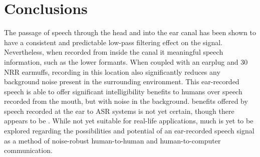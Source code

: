 \section{Conclusions}\label{chap5:conclusions}

The passage of speech through the head and into the ear canal has been shown to have a consistent and predictable low-pass filtering effect on the signal.  Nevertheless, when recorded from inside the canal it \DIFdelbegin {}\DIFdelend \DIFaddbegin {}\DIFaddend meaningful speech information, such as the lower formants.  When coupled with an earplug and 30 NRR earmuffs, recording in this location also significantly reduces any background noise present in the surrounding environment.  This ear-recorded speech is able to offer significant intelligibility benefits to humans over speech recorded from the mouth, but with noise in the background.  \DIFdelbegin {}\DIFdelend \DIFaddbegin {}\DIFaddend benefits offered by speech recorded at the ear to ASR systems is not yet certain, though there appears to be \DIFdelbegin {}\DIFdelend \DIFaddbegin {}\DIFaddend . While not yet suitable for real-life applications, much is yet to be explored regarding the possibilities and potential of an ear-recorded speech signal as a method of noise-robust human-to-human and human-to-computer communication.





